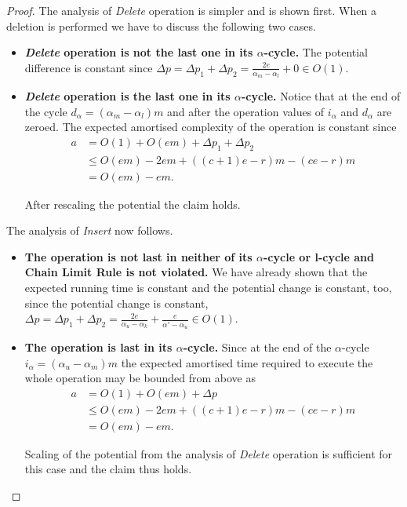 \begin{proof}
The analysis of \emph{Delete} operation is simpler and is shown first. When a deletion is performed we have to discuss the following two cases.
\begin{itemize}
\item \textbf{\emph{Delete} operation is not the last one in its $\alpha$-cycle.} The potential difference is constant since $\Delta p = \Delta p_1 + \Delta p_2 = \frac{2e}{\alpha_m - \alpha_l} + 0 \in O(1)$.

\item \textbf{\emph{Delete} operation is the last one in its $\alpha$-cycle.} Notice that at the end of the cycle $d_\alpha = (\alpha_m - \alpha_l)m$ and after the operation values of $i_\alpha$ and $d_\alpha$ are zeroed. The expected amortised complexity of the operation is constant since
\[
\begin{split}
a
	& = O(1) + O(em) + \Delta p_1 + \Delta p_2 \\
	& \leq O(em) -2em + ((c + 1)e - r)m - (ce - r)m \\
	& = O(em) - em.
\end{split}
\]

After rescaling the potential the claim holds.
\end{itemize}

The analysis of \emph{Insert} now follows.
\begin{itemize}
\item \textbf{The operation is not last in neither of its $\alpha$-cycle or l-cycle and Chain Limit Rule is not violated.}
We have already shown that the expected running time is constant and the potential change is constant, too, since the potential change is constant, 
$\Delta p = \Delta p_1 + \Delta p_2 = \frac{2e}{\alpha_u - \alpha_k} + \frac{e}{\alpha' - \alpha_u} \in O(1)$.

\item \textbf{The operation is last in its $\alpha$-cycle.} 
Since at the end of the $\alpha$-cycle $i_\alpha = (\alpha_u - \alpha_m)m$ the expected amortised time required to execute the whole operation may be bounded from above as
\[
\begin{split}
a
	& = O(1) + O(em) + \Delta p  \\
	& \leq O(em) - 2em + ((c + 1)e - r)m - (ce - r)m \\
	& = O(em) - em.
\end{split}
\]

Scaling of the potential from the analysis of \emph{Delete} operation is sufficient for this case and the claim thus holds. 


\end{itemize}
\end{proof}
